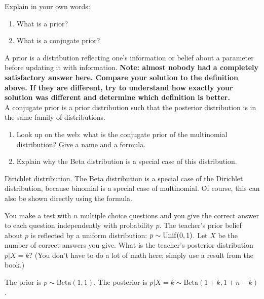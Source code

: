\documentclass[assignments]{subfiles}
\begin{document}
\begin{exercise}
Explain in your own words:
\begin{enumerate}
\item What is a prior?
\item What is a conjugate prior?
\end{enumerate}
\begin{solution}
A prior is a distribution reflecting one's information or belief about a parameter before updating it with information. \textbf{Note: almost nobody had a completely satisfactory answer here. Compare your solution to the definition above. If they are different, try to understand how exactly your solution was different and determine which definition is better.}\\
A conjugate prior is a prior distribution such that the posterior distribution is in the same family of distributions.
\end{solution}
\end{exercise}


\begin{exercise} \phantom{ }
\begin{enumerate}
\item Look up on the web: what is the conjugate prior of the multinomial distribution? Give a name and a formula.
\item Explain why the Beta distribution is a special case of this distribution.
\end{enumerate}
\begin{solution}
Dirichlet distribution. The Beta distribution is a special case of the Dirichlet distribution, because binomial is a special case of multinomial. Of course, this can also be shown directly using the formula.
\end{solution}
\end{exercise}



\begin{exercise}
You make a test with $n$ multiple choice questions and you give the correct answer to each question independently with probability $p$. The teacher's prior belief about $p$ is reflected by a uniform distribution: $p \sim \mathrm{Unif}(0,1)$.
Let $X$ be the number of correct answers you give.
What is the teacher's posterior distribution $p|X=k$? (You don't have to do a lot of math here; simply use a result from the book.)
\begin{solution}
The prior is $p \sim \text{Beta}(1,1)$. The posterior is $p|X=k \sim \text{Beta}(1+k,1+n-k)$.
\end{solution}
\end{exercise}
\end{document}
